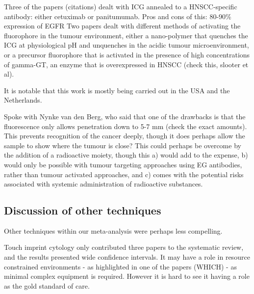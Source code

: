 Three of the papers (citations) dealt with ICG annealed to a HNSCC-specific antibody: either cetuximab or panitumumab.
Pros and cons of this: 80-90\% expression of EGFR
Two papers dealt with different methods of activating the fluorophore in the tumour environment, either a nano-polymer that quenches the ICG at physiological pH and unquenches in the acidic tumour microenvironment, or a precursor fluorophore that is activated in the presence of high concentrations of gamma-GT, an enzyme that is overexpressed in HNSCC (check this, slooter et al).

It is notable that this work is mostly being carried out in the USA and the Netherlands.

Spoke with Nynke van den Berg, who said that one of the drawbacks is that the fluorescence only allows penetration down to 5-7 mm (check the exact amounts). 
This prevents recognition of the cancer deeply, though it does perhaps allow the sample to show where the tumour is close? 
This could perhaps be overcome by the addition of a radioactive moiety, though this a) would add to the expense, b) would only be possible with tumour targeting approaches using EG antibodies, rather than tumour activated approaches, and c) comes with the potential risks associated with systemic administration of radioactive substances.

\subsection{Discussion of other techniques}

Other techniques within our meta-analysis were perhaps less compelling.

Touch imprint cytology only contributed three papers to the systematic review, and the results presented wide confidence intervals. 
It may have a role in resource constrained environments - as highlighted in one of the papers (WHICH) - as minimal complex equipment is required. 
However it is hard to see it having a role as the gold standard of care.



